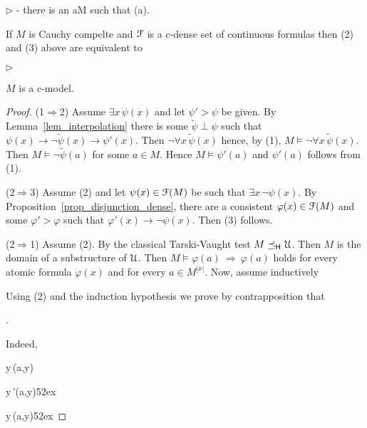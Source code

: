 \documentclass[10pt,oneside]{amsproc}
\newcommand{\mylabel}[1]{{#1}\hfill}
\renewenvironment{itemize}
  {\begin{list}{$\triangleright$}{%
  \setlength{\parskip}{0mm}
  \setlength{\topsep}{.4\baselineskip}
  \setlength{\rightmargin}{0mm}
  \setlength{\listparindent}{0mm}
  \setlength{\itemindent}{0mm}
  \setlength{\labelwidth}{3ex}
  \setlength{\itemsep}{.2\baselineskip}
  \setlength{\parsep}{.2\baselineskip}
  \setlength{\partopsep}{0mm}
  \setlength{\labelsep}{1ex}
  \setlength{\leftmargin}{\labelwidth+\labelsep}
  \let\makelabel\mylabel}}{%
\end{list}}
\def\forallH{\forall}
\def\existsH{\exists}
\begin{document}
{\begin{proposition}
\begin{itemize}
    \noindent\kern-\leftmargin
    \ceq{\hfill \existsH x\,\neg\psi(x)}{\Rightarrow}
    {\textrm{ there is an }a\in M\textrm{ such that }\neg\psi(a).}
  \end{itemize}
  If $M$ is Cauchy compelte and ${\EuScript F}$ is a c-dense set of continuous formulas then (2) and (3) above are equivalent to
  \begin{itemize}
    \item[1$'$.] $M$ is a c-model.
  \end{itemize}
\end{proposition}

\begin{proof}
  (1$\Rightarrow$2) Assume $\existsH x\,\psi(x)$ and let $\psi'>\psi$ be given.
  By Lemma~\ref{lem_interpolation} there is some $\tilde{\psi}\perp\psi$ such that  $\psi(x)\rightarrow\neg\tilde{\psi}(x)\rightarrow\psi'(x)$.
  Then $\neg\forallH x\,\tilde{\psi}(x)$ hence, by (1), $M\models\neg\forallH x\,\tilde{\psi}(x)$.
  Then $M\models\neg\tilde{\psi}(a)$ for some $a\in M$. Hence $M\models\psi'(a)$ and $\psi'(a)$ follows from (1).

  (2$\Rightarrow$3)
  Assume (2) and let $\psi(x)\in{\EuScript F}(M)$ be such that $\existsH x\,\neg\psi(x)$.
  By Proposition~\ref{prop_disjunction_dense}, there are a consistent $\varphi(x)\in{\EuScript F}(M)$ and some $\varphi'>\varphi$ such that $\varphi'(x)\rightarrow\neg\psi(x)$.
  Then (3) follows.

  (2$\Rightarrow$1)
  Assume (2).
  By the classical Tarski-Vaught test $M\preceq_{\sf H}{\EuScript U}$.
  Then $M$ is the domain of a substructure of ${\EuScript U}$.
  Then $M\models\varphi(a)\ \Rightarrow\ \varphi(a)$ holds for every atomic formula $\varphi(x)$ and for every $a\in M^{|x|}$.
  Now, assume inductively
  

  Using (2) and the induction hypothesis we prove by contrapposition that

  \ceq{\hfill M\models\forallH y\,\varphi(a,y)}{\Rightarrow}{\forallH y\,\varphi(a,y)}.

  Indeed,

  \ceq{\hfill\neg\forallH y\,\varphi(a,y)}
  {\Rightarrow}{\existsH y\,\neg\varphi(a,y)}
  
  \ceq{}
  {\Rightarrow}{\existsH y\,\neg\varphi'(a,y)}\hfill {}\kern52ex
  
  \ceq{}
  {\Rightarrow}{\existsH y\,\neg\psi(a,y)}\hfill{}\kern52ex%
  

\end{proof}}
\end{document}

